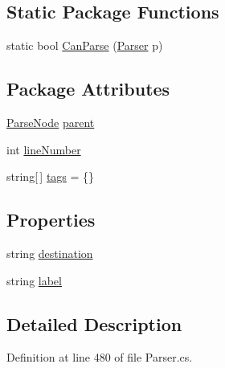 \subsection*{Static Package Functions}
\begin{DoxyCompactItemize}
\item 
static bool \hyperlink{a00146_a1ffeca22df52451120cb362f90fd4e9f}{Can\-Parse} (\hyperlink{a00149}{Parser} p)
\end{DoxyCompactItemize}
\subsection*{Package Attributes}
\begin{DoxyCompactItemize}
\item 
\hyperlink{a00148}{Parse\-Node} \hyperlink{a00148_af313a82103fcc2ff5a177dbb06b92f7b}{parent}
\item 
int \hyperlink{a00148_a18b493382de0fde5b4299c1bd2250075}{line\-Number}
\item 
string\mbox{[}$\,$\mbox{]} \hyperlink{a00148_a58b3a15788fd2d4127d73619dc6d04ae}{tags} = \{\}
\end{DoxyCompactItemize}
\subsection*{Properties}
\begin{DoxyCompactItemize}
\item 
string \hyperlink{a00146_abbe56fba06169901508e6c659f06c236}{destination}
\item 
string \hyperlink{a00146_a7f27d78e67fed6992767e995e70fc468}{label}
\end{DoxyCompactItemize}


\subsection{Detailed Description}


Definition at line 480 of file Parser.\-cs.



